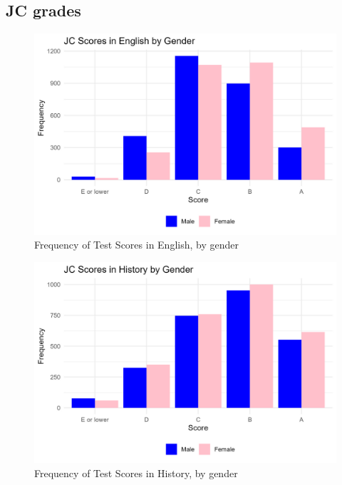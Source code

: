 \documentclass[a4paper]{article}
\begin{document}
\clearpage
\subsection{JC grades}
\begin{figure}[htbp] 
    \centering
    \includegraphics[width=1\linewidth]{Frequency of Test Scores in English by Gender.jpeg}
    \caption{Frequency of Test Scores in English, by gender}
    \label{}
\end{figure}

\begin{figure}[htbp] 
    \centering
    \includegraphics[width=1\linewidth]{Frequency of Test Scores in History by Gender.jpeg}
    \caption{Frequency of Test Scores in History, by gender}
    \label{}
\end{figure}
\end{document}
